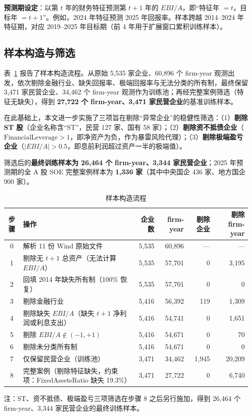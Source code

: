 \documentclass[11pt,a4paper]{ctexart}
\begin{document}
\textbf{预测期设定}：以第 $t$ 年的财务特征预测第 $t+1$ 年的 $EBI/A$，即“特征年 $=t$，目标年 $=t+1$”。例如，2024 年特征预测 2025 年回报率。样本跨越 2014--2024 年特征期，对应 2019--2025 年目标期（前 4 年用于扩展窗口累积训练样本）。

\subsection{样本构造与筛选}

表~\ref{tab:sample} 报告了样本构造流程。从原始 5{,}535 家企业、60{,}896 个 firm-year 观测出发，依次剔除金融行业、缺失回报率、极端回报率与无法分类的所有制，最终保留 3{,}471 家民营企业、34{,}462 个 firm-year 观测作为训练池；再经完整案例筛选（特征无缺失），得到 \textbf{27{,}722 个 firm-year、3{,}471 家民营企业}的基准训练样本。

在此基础上，本文进一步实施了三项旨在剔除“异常企业”的稳健性筛选：（1）\textbf{剔除 ST 股}（企业名称含“ST”，民营 127 家、国有 58 家）；（2）\textbf{剔除资不抵债企业}（$\text{FinancialLeverage}>1$，即净资产为负，作为暴雷风险代理）；（3）\textbf{剔除极端盈亏企业}（$|EBI/A|>0.5$，即息前利润超过资产一半的极端值）。

筛选后的\textbf{最终训练样本为 26{,}464 个 firm-year、3{,}344 家民营企业}；2025 年预测期的全 A 股 SOE 完整案例样本为 \textbf{1{,}336 家}（其中中央国企 436 家、地方国企 900 家）。

\begin{table}[htbp]
\centering
\caption{样本构造流程}
\label{tab:sample}
\begin{threeparttable}
\small
\begin{tabular}{clrrrr}
\toprule
步骤 & 操作 & 企业数 & firm-year & 剔除企业 & 剔除 firm-year \\
\midrule
0 & 解析 11 份 Wind 原始文件 & 5{,}535 & 60{,}896 & --- & --- \\
1 & 剔除无 $t+1$ 总资产（无法计算 $EBI/A$） & 5{,}535 & 57{,}701 & 0 & 3{,}195 \\
2 & 回填 2014 年缺失所有制（100\% 恢复） & 5{,}535 & 57{,}701 & 0 & 0 \\
3 & 剔除金融行业 & 5{,}416 & 56{,}392 & 119 & 1{,}309 \\
4 & 剔除缺失 $EBI/A$（缺失 $t+1$ 净利润或利息支出） & 5{,}416 & 54{,}741 & 0 & 1{,}651 \\
5 & 剔除 $EBI/A\notin(-1,+1)$ & 5{,}416 & 54{,}671 & 0 & 70 \\
6 & 剔除未分类所有制 & 5{,}416 & 54{,}671 & 0 & 0 \\
7 & 仅保留民营企业（训练池） & 3{,}471 & 34{,}462 & 1{,}945 & 20{,}209 \\
8 & 完整案例（剔除特征缺失，约束项：FixedAssetsRatio 缺失 19.3\%） & 3{,}471 & 27{,}722 & 0 & 6{,}740 \\
\bottomrule
\end{tabular}
\begin{tablenotes}
\footnotesize\raggedright
\item 注：ST、资不抵债、极端盈亏三项筛选在步骤 8 之后另行施加，得到 26{,}464 个 firm-year、3{,}344 家民营企业的最终训练样本。
\end{tablenotes}
\end{threeparttable}
\end{table}
\end{document}

